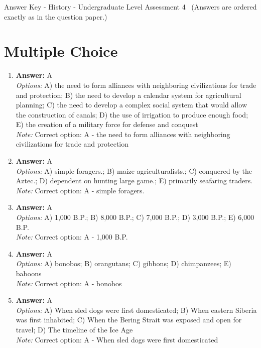 \documentclass[12pt]{article}
\begin{document}
\begin{center}
Answer Key - History - Undergraduate Level Assessment 4 \
\small (Answers are ordered exactly as in the question paper.)
\end{center}

\section*{Multiple Choice}
\begin{enumerate}[label=\arabic*.]
\item \textbf{Answer:} A
\\ \textit{Options:} A) the need to form alliances with neighboring civilizations for trade and protection; B) the need to develop a calendar system for agricultural planning; C) the need to develop a complex social system that would allow the construction of canals; D) the use of irrigation to produce enough food; E) the creation of a military force for defense and conquest
\\ \textit{Note:} Correct option: A - the need to form alliances with neighboring civilizations for trade and protection
\item \textbf{Answer:} A
\\ \textit{Options:} A) simple foragers.; B) maize agriculturalists.; C) conquered by the Aztec.; D) dependent on hunting large game.; E) primarily seafaring traders.
\\ \textit{Note:} Correct option: A - simple foragers.
\item \textbf{Answer:} A
\\ \textit{Options:} A) 1,000 B.P.; B) 8,000 B.P.; C) 7,000 B.P.; D) 3,000 B.P.; E) 6,000 B.P.
\\ \textit{Note:} Correct option: A - 1,000 B.P.
\item \textbf{Answer:} A
\\ \textit{Options:} A) bonobos; B) orangutans; C) gibbons; D) chimpanzees; E) baboons
\\ \textit{Note:} Correct option: A - bonobos
\item \textbf{Answer:} A
\\ \textit{Options:} A) When sled dogs were first domesticated; B) When eastern Siberia was first inhabited; C) When the Bering Strait was exposed and open for travel; D) The timeline of the Ice Age
\\ \textit{Note:} Correct option: A - When sled dogs were first domesticated
\end{enumerate}
\end{document}
